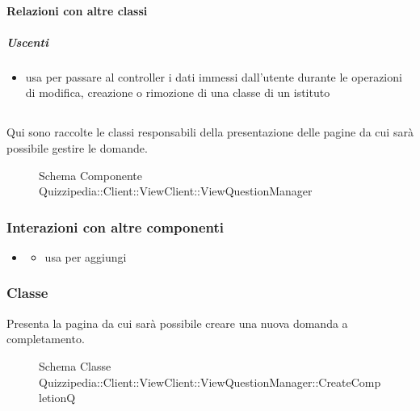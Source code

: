 \paragraph{Relazioni con altre classi}
\subparagraph{Uscenti}
\begin{itemize}
\item usa  per passare al controller i dati immessi dall'utente durante le operazioni di modifica, creazione o rimozione di una classe di un istituto
\end{itemize}
\subsection{}
Qui sono raccolte le classi responsabili della presentazione delle pagine da cui sarà possibile gestire le domande.
\begin{figure}[H]
\centering
\noindent{}
\caption[Schema Componente Quizzipedia::Client::ViewClient::ViewQuestionManager]{Schema Componente Quizzipedia::Client::ViewClient::ViewQuestionManager}
\end{figure}
\subsubsection{Interazioni con altre componenti}
\begin{itemize}
\item {}
\begin{itemize}
\item usa  per aggiungi
\end{itemize}
\end{itemize}
\subsubsection{Classe }
Presenta la pagina da cui sarà possibile creare una nuova domanda a completamento.
\begin{figure}[H]
\centering
\noindent{}
\caption[Schema Classe CreateCompletionQ]{Schema Classe Quizzipedia::Client::ViewClient::ViewQuestionManager::CreateCompletionQ}
\end{figure}

